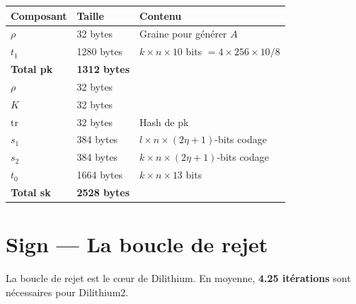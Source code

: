 \documentclass[12pt, a4paper]{article}
\begin{document}
\begin{center}
\begin{tabular}{lll}
\toprule
\textbf{Composant} & \textbf{Taille} & \textbf{Contenu} \\
\midrule
$\rho$ & 32 bytes & Graine pour générer $A$ \\
$t_1$ & 1280 bytes & $k \times n \times 10$ bits $= 4 \times 256 \times 10 / 8$ \\
\textbf{Total pk} & \textbf{1312 bytes} & \\
\midrule
$\rho$ & 32 bytes & \\
$K$ & 32 bytes & \\
$\text{tr}$ & 32 bytes & Hash de pk \\
$s_1$ & 384 bytes & $l \times n \times (2\eta+1)$-bits codage \\
$s_2$ & 384 bytes & $k \times n \times (2\eta+1)$-bits codage \\
$t_0$ & 1664 bytes & $k \times n \times 13$ bits \\
\textbf{Total sk} & \textbf{2528 bytes} & \\
\bottomrule
\end{tabular}
\end{center}

\section{Sign --- La boucle de rejet}

\begin{warningbox}
La boucle de rejet est le cœur de Dilithium.
En moyenne, \textbf{4.25 itérations} sont nécessaires pour Dilithium2.
\end{warningbox}
\end{document}
